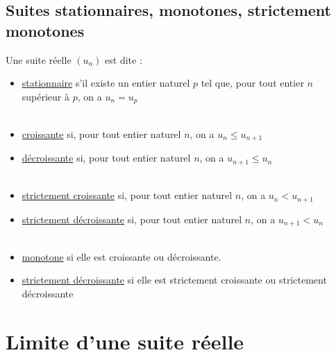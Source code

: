 \subsection{Suites stationnaires, monotones, strictement monotones}
\begin{defprop}
    Une suite réelle \((u_n)\) est dite :
    \begin{itemize}
        \item \underline{stationnaire} s'il existe un entier naturel \(p\) tel que, pour tout entier \(n\) supérieur à \(p\), on a \(u_n = u_p\)\\~\\
        \item \underline{croissante} si, pour tout entier naturel \(n\), on a \(u_n \leq u_{n+1}\)
        \item \underline{décroissante} si, pour tout entier naturel \(n\), on a \(u_{n+1}\leq u_n\)\\~\\
        \item \underline{strictement croissante} si, pour tout entier naturel \(n\), on a \(u_n < u_{n+1}\)
        \item \underline{strictement décroissante} si, pour tout entier naturel \(n\), on a \(u_{n+1}< u_n\)\\~\\
        \item \underline{monotone} si elle est croissante ou décroissante.
        \item \underline{strictement décroissante} si elle est strictement croissante ou strictement décroissante
    \end{itemize} 
\end{defprop}

\section{ Limite d'une suite réelle}
